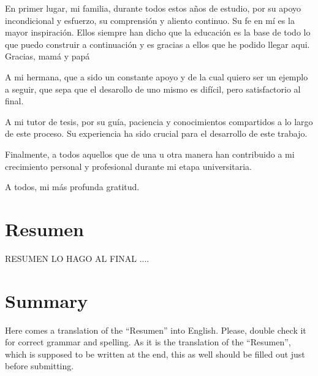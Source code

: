\documentclass[a4paper, 12pt]{book}
\begin{document}
En primer lugar, mi familia, durante todos estos años de estudio, por su apoyo incondicional y esfuerzo, su comprensión y aliento continuo. Su fe en mí es la mayor inspiración. Ellos siempre han dicho que la educación es la base de todo lo que puedo construir a continuación y es gracias a ellos que he podido llegar aqui. Gracias, mamá y papá

A mi hermana, que a sido un constante apoyo y de la cual quiero ser un ejemplo a seguir, que sepa que el desarollo de uno mismo es difícil, pero satisfactorio al final.

A mi tutor de tesis, por su guía, paciencia y conocimientos compartidos a lo largo de este proceso. Su experiencia ha sido crucial para el desarrollo de este trabajo.

Finalmente, a todos aquellos que de una u otra manera han contribuido a mi crecimiento personal y profesional durante mi etapa universitaria.

A todos, mi más profunda gratitud.



\chapter*{Resumen}

RESUMEN LO HAGO AL FINAL ....




\chapter*{Summary}

Here comes a translation of the ``Resumen'' into English. 
Please, double check it for correct grammar and spelling.
As it is the translation of the ``Resumen'', which is supposed to be written at the end, this as well should be filled out just before submitting.


\end{document}
